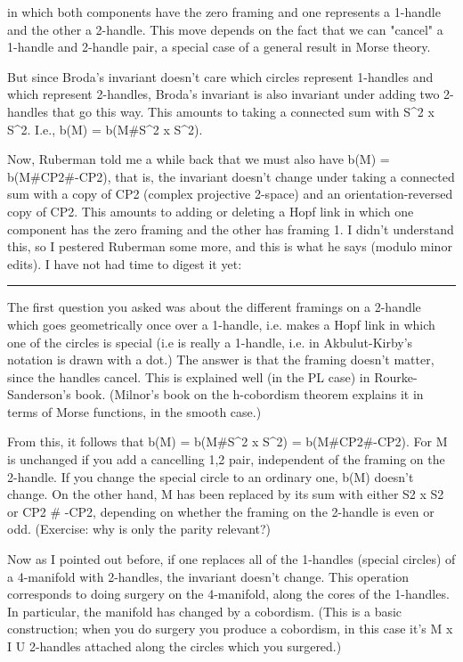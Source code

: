 in which both components have the zero framing and one represents a
1-handle and the other a 2-handle.  This move depends on the fact that
we can "cancel" a 1-handle and 2-handle pair, a special case of a
general result in Morse theory.  

But since Broda's invariant doesn't care which circles represent
1-handles and which represent 2-handles, Broda's invariant is also
invariant under adding two 2-handles that go this way.  This amounts to
taking a connected sum with S^2 x S^2.  I.e., b(M) = b(M#S^2 x S^2).  

Now, Ruberman told me a while back that we must also have b(M) =
b(M#CP2#-CP2), that is, the invariant doesn't change under taking a
connected sum with a copy of CP2 (complex projective 2-space) and an
orientation-reversed copy of CP2.  This amounts to adding or deleting a
Hopf link in which one component has the zero framing and the other has
framing 1.  I didn't understand this, so I pestered Ruberman some more,
and this is what he says (modulo minor edits).  I have not had time to
digest it yet: 

\par\noindent\rule{\textwidth}{0.4pt}
The first question you asked was about the different framings on a 2-handle
which goes geometrically once over a 1-handle, i.e. makes a Hopf link in
which one of the circles is special (i.e is really a 1-handle, i.e. in
Akbulut-Kirby's notation is drawn with a dot.)  The answer is that the
framing doesn't matter, since the handles cancel.  This is explained well
(in the PL case) in Rourke-Sanderson's book.  (Milnor's book on the 
h-cobordism theorem explains it in terms of Morse functions, in the
smooth case.) 

From this, it follows that b(M) = b(M#S^2 x S^2) = b(M#CP2#-CP2).   For
M is unchanged if you add a cancelling 1,2 pair, independent of the framing
on the 2-handle.  If you change the special circle to an ordinary one,
b(M) doesn't change.  On the other hand, M has been replaced by its sum
with either S2 x S2 or CP2 # -CP2, depending on whether the framing on the
2-handle is even or odd. (Exercise: why is only the parity relevant?)

Now as I pointed out before, if one replaces all of the 1-handles
(special circles) of a 4-manifold with 2-handles, the invariant doesn't
change.  This operation corresponds to doing surgery on the 4-manifold,
along the cores of the 1-handles.  In particular, the manifold has
changed by a cobordism.  (This is a basic construction; when you do
surgery you produce a cobordism, in this case it's M x I U 2-handles
attached along the circles which you surgered.) 

